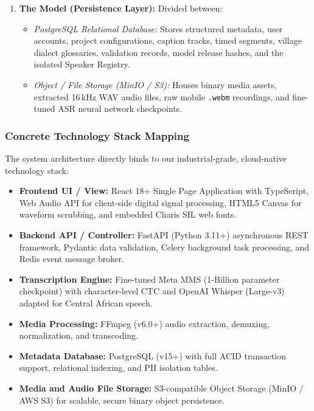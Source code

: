 \documentclass[conference]{IEEEtran}
\begin{document}
\begin{enumerate}
\begin{itemize}
    \end{itemize}
    \item \textbf{The Model (Persistence Layer):} Divided between:
    \begin{itemize}
        \item \textit{PostgreSQL Relational Database:} Stores structured metadata, user accounts, project configurations, caption tracks, timed segments, village dialect glossaries, validation records, model release hashes, and the isolated Speaker Registry.
        \item \textit{Object / File Storage (MinIO / S3):} Houses binary media assets, extracted 16\,kHz WAV audio files, raw mobile \texttt{.webm} recordings, and fine-tuned ASR neural network checkpoints.
    \end{itemize}
\end{enumerate}

\subsubsection{Concrete Technology Stack Mapping}
\label{sec:design:arch:techstack}
The system architecture directly binds to our industrial-grade, cloud-native technology stack:
\begin{itemize}
    \item \textbf{Frontend UI / View:} React 18+ Single Page Application with TypeScript, Web Audio API for client-side digital signal processing, HTML5 Canvas for waveform scrubbing, and embedded Charis SIL web fonts.
    \item \textbf{Backend API / Controller:} FastAPI (Python 3.11+) asynchronous REST framework, Pydantic data validation, Celery background task processing, and Redis event message broker.
    \item \textbf{Transcription Engine:} Fine-tuned Meta MMS (1-Billion parameter checkpoint) with character-level CTC and OpenAI Whisper (Large-v3) adapted for Central African speech.
    \item \textbf{Media Processing:} FFmpeg (v6.0+) audio extraction, demuxing, normalization, and transcoding.
    \item \textbf{Metadata Database:} PostgreSQL (v15+) with full ACID transaction support, relational indexing, and PII isolation tables.
    \item \textbf{Media and Audio File Storage:} S3-compatible Object Storage (MinIO / AWS S3) for scalable, secure binary object persistence.
\end{itemize}
\end{document}
